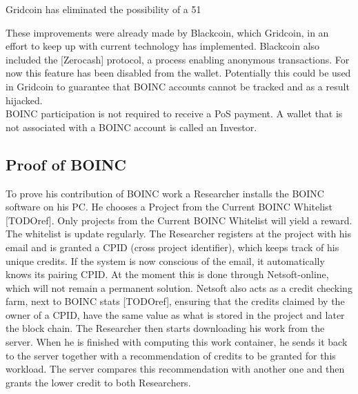 Gridcoin has eliminated the possibility of a 51%

These improvements were already made by Blackcoin, which Gridcoin, in an effort to keep up with current technology has implemented. Blackcoin also included the [Zerocash] protocol, a process enabling anonymous transactions. For now this feature has been disabled from the wallet. Potentially this could be used in Gridcoin to guarantee that BOINC accounts cannot be tracked and as a result hijacked.\\

BOINC participation is not required to receive a PoS payment. A wallet that is not associated with a BOINC account is called an Investor.

\subsection{Proof of BOINC}

To prove his contribution of BOINC work a Researcher installs the BOINC software on his PC. He chooses a Project from the Current BOINC Whitelist [TODOref]. Only projects from the Current BOINC Whitelist will yield a reward. The whitelist is update regularly. The Researcher registers at the project with his email and is granted a CPID (cross project identifier), which keeps track of his unique credits. If the system is now conscious of the email, it automatically knows its pairing CPID. At the moment this is done through Netsoft-online, which will not remain a permanent solution. Netsoft also acts as a credit checking farm, next to BOINC stats [TODOref], ensuring that the credits claimed by the owner of a CPID, have the same value as what is stored in the project and later the block chain. The Researcher then starts downloading his work from the server. When he is finished with computing this work container, he sends it back to the server together with a recommendation of credits to be granted for this workload. The server compares this recommendation with another one and then grants the lower credit to both Researchers.\\

